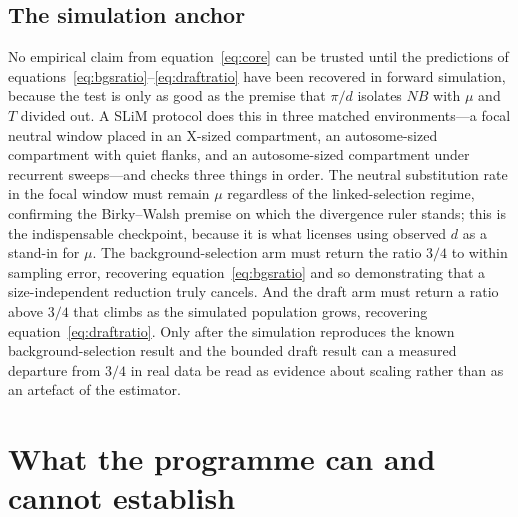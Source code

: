\documentclass[11pt,a4paper]{article}
\begin{document}
\subsection{The simulation anchor}

No empirical claim from equation~\eqref{eq:core} can be trusted until the predictions of equations~\eqref{eq:bgsratio}--\eqref{eq:draftratio} have been recovered in forward simulation, because the test is only as good as the premise that $\pi/d$ isolates $NB$ with $\mu$ and $T$ divided out. A SLiM protocol does this in three matched environments---a focal neutral window placed in an X-sized compartment, an autosome-sized compartment with quiet flanks, and an autosome-sized compartment under recurrent sweeps---and checks three things in order. The neutral substitution rate in the focal window must remain $\mu$ regardless of the linked-selection regime, confirming the Birky--Walsh premise on which the divergence ruler stands; this is the indispensable checkpoint, because it is what licenses using observed $d$ as a stand-in for $\mu$. The background-selection arm must return the ratio $3/4$ to within sampling error, recovering equation~\eqref{eq:bgsratio} and so demonstrating that a size-independent reduction truly cancels. And the draft arm must return a ratio above $3/4$ that climbs as the simulated population grows, recovering equation~\eqref{eq:draftratio}. Only after the simulation reproduces the known background-selection result and the bounded draft result can a measured departure from $3/4$ in real data be read as evidence about scaling rather than as an artefact of the estimator.

\section{What the programme can and cannot establish}
\end{document}
